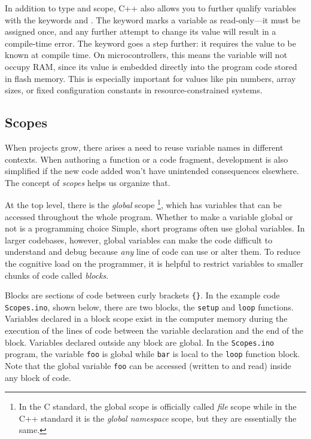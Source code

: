 In addition to type and scope, C++ also allows you to further qualify variables with the keywords  and . 
The  keyword marks a variable as read-only---it must be assigned once, and any further attempt to change its value will result in a compile-time error.
The  keyword goes a step further: it requires the value to be known at compile time. 
On microcontrollers, this means the variable will not occupy RAM, since its value is embedded directly into the program code stored in flash memory. 
This is especially important for values like pin numbers, array sizes, or fixed configuration constants in resource-constrained systems.

\subsection{Scopes}
When projects grow, there arises a need to reuse variable names in different contexts.
When authoring a function or a code fragment, development is also simplified if the new code added won't have unintended consequences elsewhere.
The concept of \emph{scopes} helps us organize that.

At the top level, there is the \emph{global} scope%
\footnote{%
  In the C standard, the global scope is officially called \emph{file} scope while in the C++ standard it is the \emph{global namespace} scope, but they are essentially the same. \cneed
}, which has variables that can be accessed throughout the whole program.
Whether to make a variable global or not is a programming choice
Simple, short programs often use global variables.
In larger codebases, however, global variables can make the code difficult to understand and debug because \emph{any} line of code can use or alter them.
To reduce the cognitive load on the programmer, it is helpful to restrict variables to smaller chunks of code called \emph{blocks}.

Blocks are sections of code between curly brackets \texttt{\{\}}.
In the example code \texttt{Scopes.ino}, shown below, there are two blocks, the \texttt{setup} and \texttt{loop} functions.
Variables declared in a block scope exist in the computer memory during the execution of the lines of code between the variable declaration and the end of the block.
Variables declared outside any block are global.
In the \texttt{Scopes.ino} program, the variable \texttt{foo} is global while \texttt{bar} is local to the \texttt{loop} function block.
Note that the global variable \texttt{foo} can be accessed (written to and read) inside any block of code.


